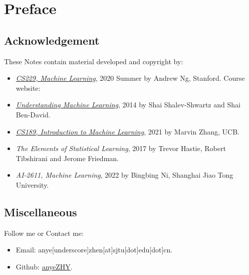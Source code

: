 \section*{Preface}
\subsection*{Acknowledgement}
These Notes contain material developed and copyright by:
\begin{itemize}
	\item
		\href{http://cs229.stanford.edu/syllabus-summer2020.html}{\textit{CS229, Machine Learning}}, {\textcopyright} 2020 Summer by Andrew Ng, Stanford. Course website: 
	\item 
		\href{https://www.cs.huji.ac.il/w~shais/UnderstandingMachineLearning/}{\textit{Understanding Machine Learning}}, {\textcopyright} 2014 by Shai Shalev-Shwartz and Shai Ben-David.
	\item
		\href{https://www.eecs189.org}{\textit{CS189, Introduction to Machine Learning}}, {\textcopyright} 2021 by Marvin Zhang, UCB.
	\item
		\textit{The Elements of Statistical Learning}, {\textcopyright} 2017 by  Trevor Hastie, Robert Tibshirani and Jerome Friedman.
	\item
		\textit{AI-2611, Machine Learning}, {\textcopyright} 2022 by Bingbing Ni, Shanghai Jiao Tong University.
\end{itemize}

\subsection*{Miscellaneous}
Follow me or Contact me:
\begin{itemize}
	\item
		Email: anye[underscore]zhen[at]sjtu[dot]edu[dot]cn.
	\item
		Github: \href{http://githb.com/anyeZHY}{anyeZHY}.
\end{itemize}

